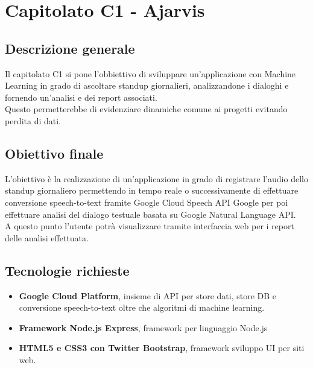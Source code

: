 \documentclass[main.tex]{subfiles}
\begin{document}
\chapter{Capitolato C1 - Ajarvis}
\section{Descrizione generale}
Il capitolato C1 si pone l'obbiettivo di sviluppare un'applicazione con Machine Learning in grado di ascoltare standup giornalieri, analizzandone i dialoghi e fornendo un'analisi e dei report associati.\\
Questo permetterebbe di evidenziare dinamiche comune ai progetti evitando perdita di dati.

\section{Obiettivo finale}
L’obiettivo è la realizzazione di un'applicazione in grado di registrare l'audio dello standup giornaliero permettendo in tempo reale o successivamente di effettuare conversione speech-to-text framite Google Cloud Speech API Google per poi effettuare analisi del dialogo testuale basata su Google Natural Language API.\\
A questo punto l'utente potrà visualizzare tramite interfaccia web per i report delle analisi effettuata. 

\section{Tecnologie richieste}
\begin{itemize}
	\item \textbf{Google Cloud Platform}, insieme di API per store dati, store DB e conversione speech-to-text oltre che algoritmi di machine learning.
	\item \textbf{ Framework Node.js Express}, framework per linguaggio Node.js 
	\item \textbf{ HTML5 e CSS3 con Twitter Bootstrap}, framework sviluppo UI per siti web.
\end{itemize}
\end{document}

